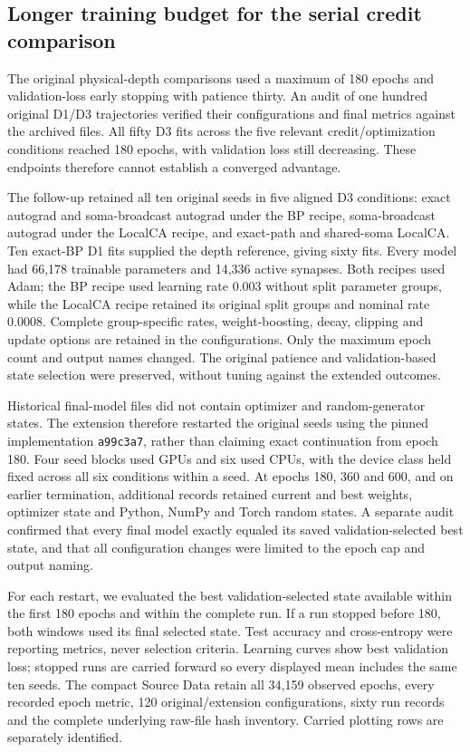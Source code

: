 \subsection{Longer training budget for the serial credit comparison}

The original physical-depth comparisons used a maximum of 180 epochs and validation-loss early stopping with patience thirty. An audit of one hundred original D1/D3 trajectories verified their configurations and final metrics against the archived files. All fifty D3 fits across the five relevant credit/optimization conditions reached 180 epochs, with validation loss still decreasing. These endpoints therefore cannot establish a converged advantage.

The follow-up retained all ten original seeds in five aligned D3 conditions: exact autograd and soma-broadcast autograd under the BP recipe, soma-broadcast autograd under the LocalCA recipe, and exact-path and shared-soma LocalCA. Ten exact-BP D1 fits supplied the depth reference, giving sixty fits. Every model had 66,178 trainable parameters and 14,336 active synapses. Both recipes used Adam; the BP recipe used learning rate 0.003 without split parameter groups, while the LocalCA recipe retained its original split groups and nominal rate 0.0008. Complete group-specific rates, weight-boosting, decay, clipping and update options are retained in the configurations. Only the maximum epoch count and output names changed. The original patience and validation-based state selection were preserved, without tuning against the extended outcomes.

Historical final-model files did not contain optimizer and random-generator states. The extension therefore restarted the original seeds using the pinned implementation \texttt{a99c3a7}, rather than claiming exact continuation from epoch 180. Four seed blocks used GPUs and six used CPUs, with the device class held fixed across all six conditions within a seed. At epochs 180, 360 and 600, and on earlier termination, additional records retained current and best weights, optimizer state and Python, NumPy and Torch random states. A separate audit confirmed that every final model exactly equaled its saved validation-selected best state, and that all configuration changes were limited to the epoch cap and output naming.

For each restart, we evaluated the best validation-selected state available within the first 180 epochs and within the complete run. If a run stopped before 180, both windows used its final selected state. Test accuracy and cross-entropy were reporting metrics, never selection criteria. Learning curves show best validation loss; stopped runs are carried forward so every displayed mean includes the same ten seeds. The compact Source Data retain all 34,159 observed epochs, every recorded epoch metric, 120 original/extension configurations, sixty run records and the complete underlying raw-file hash inventory. Carried plotting rows are separately identified.

